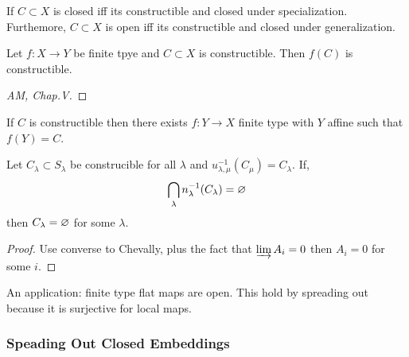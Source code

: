 \documentclass[12pt]{article}
\begin{document}
\begin{prop}
If $C \subset X$ is closed iff its constructible and closed under specialization. Furthemore, $C \subset X$ is open iff its constructible and closed under generalization.
\end{prop}

\begin{thm}[Chevallay]
Let $f : X \to Y$ be finite tpye and $C \subset X$ is constructible. Then $f(C)$ is constructible.
\end{thm}

\begin{proof}
[AM, Chap.V]
\end{proof}

\begin{prop}
If $C$ is constructible then there exists $f : Y \to X$ finite type with $Y$ affine such that $f(Y) = C$.
\end{prop}

\begin{cor}
Let $C_\lambda \subset S_\lambda$ be construcible for all $\lambda$ and $u_{\lambda, \mu}^{-1}(C_\mu) = C_\lambda$. If,
\[ \bigcap_{\lambda} n_\lambda^{-1}(C_\lambda) = \varnothing \]
then $C_\lambda = \varnothing$ for some $\lambda$.
\end{cor}

\begin{proof}
Use converse to Chevally, plus the fact that $\varinjlim A_i = 0$ then $A_i = 0$ for some $i$. 
\end{proof}

\begin{rmk}
An application: finite type flat maps are open. This hold by spreading out because it is surjective for local maps. 
\end{rmk}

\subsubsection{Speading Out Closed Embeddings}
\end{document}
